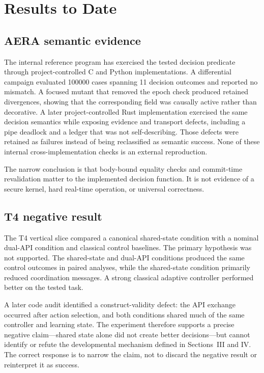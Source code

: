 \documentclass[journal,10pt]{IEEEtran}
\begin{document}
\section{Results to Date}
\subsection{AERA semantic evidence}
The internal reference program has exercised the tested decision predicate through project-controlled C and Python implementations. A differential campaign evaluated \num{100000} cases spanning 11 decision outcomes and reported no mismatch. A focused mutant that removed the epoch check produced retained divergences, showing that the corresponding field was causally active rather than decorative. A later project-controlled Rust implementation exercised the same decision semantics while exposing evidence and transport defects, including a pipe deadlock and a ledger that was not self-describing. Those defects were retained as failures instead of being reclassified as semantic success. None of these internal cross-implementation checks is an external reproduction.

The narrow conclusion is that body-bound equality checks and commit-time revalidation matter to the implemented decision function. It is not evidence of a secure kernel, hard real-time operation, or universal correctness.

\subsection{T4 negative result}
The T4 vertical slice compared a canonical shared-state condition with a nominal dual-API condition and classical control baselines. The primary hypothesis was not supported. The shared-state and dual-API conditions produced the same control outcomes in paired analyses, while the shared-state condition primarily reduced coordination messages. A strong classical adaptive controller performed better on the tested task.

A later code audit identified a construct-validity defect: the API exchange occurred after action selection, and both conditions shared much of the same controller and learning state. The experiment therefore supports a precise negative claim---shared state alone did not create better decisions---but cannot identify or refute the developmental mechanism defined in Sections~III and IV. The correct response is to narrow the claim, not to discard the negative result or reinterpret it as success.
\end{document}
